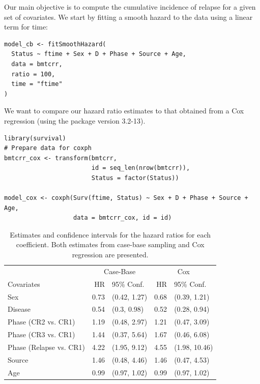 Our main objective is to compute the cumulative incidence of relapse for a given set of covariates. We start by fitting a smooth hazard to the data using a linear term for time:

\begin{verbatim}
model_cb <- fitSmoothHazard(
  Status ~ ftime + Sex + D + Phase + Source + Age,
  data = bmtcrr,
  ratio = 100,
  time = "ftime"
)
\end{verbatim}

We want to compare our hazard ratio estimates to that obtained from a Cox regression (using the  package version 3.2-13).

\begin{verbatim}
library(survival)
# Prepare data for coxph
bmtcrr_cox <- transform(bmtcrr, 
                        id = seq_len(nrow(bmtcrr)),
                        Status = factor(Status))

model_cox <- coxph(Surv(ftime, Status) ~ Sex + D + Phase + Source + Age,
                   data = bmtcrr_cox, id = id)
\end{verbatim}

\begin{table}

\caption{\label{tab:bmtcrr-cis}Estimates and confidence intervals for the hazard ratios for each coefficient. Both estimates from case-base sampling and Cox regression are presented.}
\centering
\begin{tabular}[t]{lrlrl}
\toprule
\multicolumn{1}{c}{ } & \multicolumn{2}{c}{Case-Base} & \multicolumn{2}{c}{Cox} \\
\cmidrule(l{3pt}r{3pt}){2-3} \cmidrule(l{3pt}r{3pt}){4-5}
Covariates & HR & 95\% Conf. & HR & 95\% Conf.\\
\midrule
Sex & 0.73 & (0.42, 1.27) & 0.68 & (0.39, 1.21)\\
Disease & 0.54 & (0.3, 0.98) & 0.52 & (0.28, 0.94)\\
Phase (CR2 vs. CR1) & 1.19 & (0.48, 2.97) & 1.21 & (0.47, 3.09)\\
Phase (CR3 vs. CR1) & 1.44 & (0.37, 5.64) & 1.67 & (0.46, 6.08)\\
Phase (Relapse vs. CR1) & 4.22 & (1.95, 9.12) & 4.55 & (1.98, 10.46)\\
\addlinespace
Source & 1.46 & (0.48, 4.46) & 1.46 & (0.47, 4.53)\\
Age & 0.99 & (0.97, 1.02) & 0.99 & (0.97, 1.02)\\
\bottomrule
\end{tabular}
\end{table}

